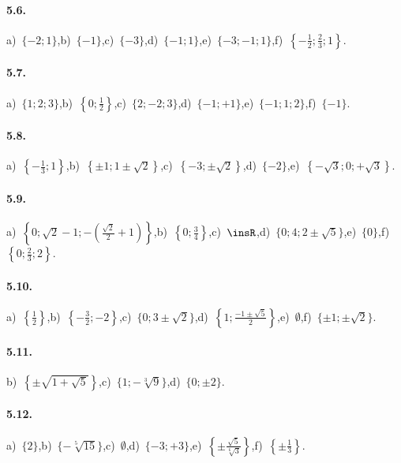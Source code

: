 \paragraph{5.6.} a)~$\{-2;1\}$,\quad b)~$\{-1\}$,\quad c)~$\{-3\}$,\quad d)~$\{-1;1\}$,\quad e)~$\{-3;-1;1\}$,\quad f)~$\left\{-\frac1 2;\frac 2 3;1\right\}$.

\paragraph{5.7.} a)~$\{1;2;3\}$,\quad b)~$\left\{0;\frac1 2\right\}$,\quad c)~$\{2;-2;3\}$,\quad d)~$\{-1;+1\}$,\quad e)~$\{-1;1;2\}$,\quad f)~$\{-1\}$.

\paragraph{5.8.} a)~$\left\{-\frac 1 3;1\right\}$,\quad b)~$\left\{\pm 1;1\pm \sqrt 2\right\}$,\quad c)~$\left\{-3;\pm \sqrt 2\right\}$,\quad d)~$\{-2\}$,\quad e)~$\left\{-\sqrt 3;0;+\sqrt 3\right\}$.

\paragraph{5.9.} a)~$\left\{0;\sqrt 2-1;-\left(\frac{\sqrt 2} 2+1\right)\right\}$,\quad b)~$\left\{0;\frac 3 4\right\}$,\quad c)~$\insR$,\quad d)~$\{0;4;2\pm \sqrt 5\}$,\quad e)~$\{0\}$,\quad f)~$\left\{0;\frac 2 3;2\right\}$.

\paragraph{5.10.} a)~$\left\{\frac 1 2\right\}$,\quad b)~$\left\{-\frac 3 2;-2\right\}$,\quad c)~$\{0;3\pm \sqrt 2\}$,\quad d)~$\left\{1;\frac{-1\pm \sqrt 5} 2\right\}$,\quad e)~$\emptyset $,\quad f)~$\{\pm 1;\pm \sqrt 2\}$.

\paragraph{5.11.} b)~$\left\{\pm \sqrt{1+\sqrt 5}\right\}$,\quad c)~$\{1;-\sqrt[3]9\}$,\quad d)~$\{0;\pm 2\}$.

\paragraph{5.12.} a)~$\{2\}$,\quad b)~$\{-\sqrt[5]{15}\}$,\quad c)~$\emptyset $,\quad d)~$\{-3;+3\}$,\quad e)~$\left\{\pm \frac{\sqrt 5}{\sqrt[6]3}\right\}$,\quad f)~$\left\{\pm \frac 1 3\right\}$.

